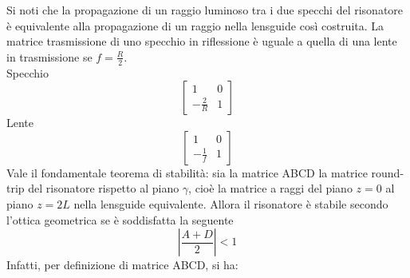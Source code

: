 Si noti che la propagazione di un raggio luminoso tra i due specchi del risonatore è equivalente alla propagazione di un raggio nella lensguide così costruita.
La matrice trasmissione di uno specchio in riflessione è uguale a quella di una lente in trasmissione se $f = \frac{R}{2}$.\\
Specchio
\begin{equation*}
\begin{bmatrix}
1	&	0\\
-\frac{2}{R}	&	1
\end{bmatrix}
\end{equation*}
Lente
\begin{equation*}
\begin{bmatrix}
1	&	0\\
-\frac{1}{f}	&	1
\end{bmatrix}
\end{equation*}
Vale il fondamentale teorema di stabilità: sia la matrice ABCD la matrice round-trip del risonatore rispetto al piano $\gamma$, cioè la matrice a raggi del piano $z=0$ al piano $z=2L$ nella lensguide equivalente. Allora il risonatore è stabile secondo l'ottica geometrica se è soddisfatta la seguente
\begin{equation*}
\left| \frac{A+D}{2} \right| < 1
\end{equation*}
Infatti, per definizione di matrice ABCD, si ha:
